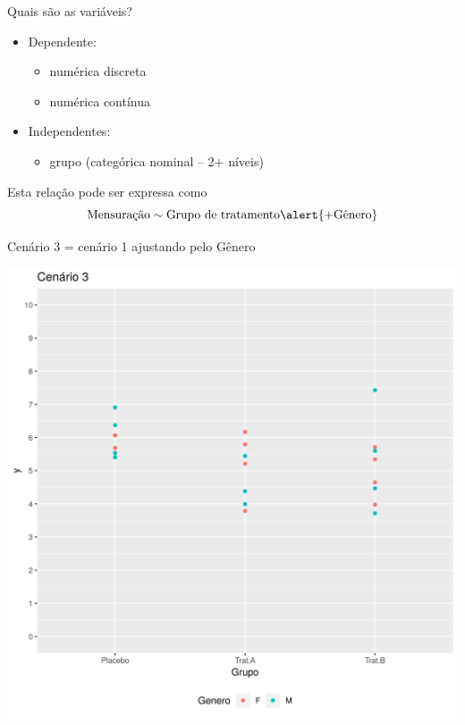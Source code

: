 \documentclass{beamer}
\begin{document}
\begin{frame}{Quais são as variáveis?}
  \begin{itemize}
    \small
  \item Dependente:
    \begin{itemize}
      \footnotesize
    \item numérica discreta
    \item numérica contínua
    \end{itemize}
  \item Independentes:
    \begin{itemize}
      \footnotesize
    \item grupo (categórica nominal -- 2+ níveis)
    \end{itemize}
  \end{itemize}
  \vfill
  \begin{block}{Esta relação pode ser expressa como}
    \begin{displaymath}
      \text{Mensuração} \sim \text{Grupo de tratamento} \alert{+ \text{Gênero}}
    \end{displaymath}
  \end{block}
\end{frame}



\begin{frame}[label=cenario3]{\small Cenário 3 = cenário 1 ajustando pelo Gênero}
  \begin{center}
    \includegraphics[height=.9\textheight]{Cap13-30/cenario12}
  \end{center}
\end{frame}
\end{document}

